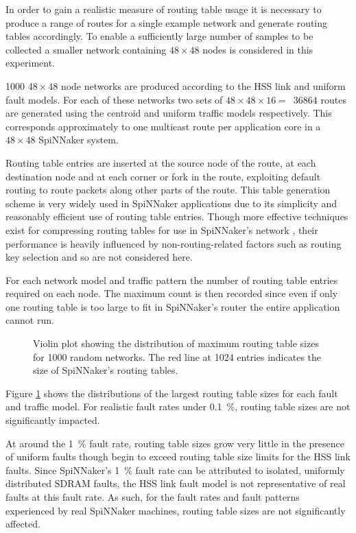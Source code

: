 			In order to gain a realistic measure of routing table usage it is
			necessary to produce a range of routes for a single example network and
			generate routing tables accordingly.  To enable a sufficiently large
			number of samples to be collected a smaller network containing
			$48\times48$ nodes is considered in this experiment.
			
			\num{1000} $48\times48$ node networks are produced according to the HSS
			link and uniform fault models. For each of these networks two sets of
			$48\times48\times16=$~\num{36864} routes are generated using the centroid
			and uniform traffic models respectively. This corresponds approximately
			to one multicast route per application core in a $48\times48$ SpiNNaker
			system.
			
			Routing table entries are inserted at the source node of the route, at
			each destination node and at each corner or fork in the route, exploiting
			default routing to route packets along other parts of the route. This
			table generation scheme is very widely used in SpiNNaker applications due
			to its simplicity and reasonably efficient use of routing table entries.
			Though more effective techniques exist for compressing routing tables for
			use in SpiNNaker's network \cite{mundy16}, their performance is heavily
			influenced by non-routing-related factors such as routing key selection
			and so are not considered here.
			
			For each network model and traffic pattern the number of routing table
			entries required on each node. The maximum count is then recorded since
			even if only one routing table is too large to fit in SpiNNaker's router
			the entire application cannot run.
			
			\begin{figure}
				\center
				
				\caption{Violin plot showing the distribution of maximum routing table
				sizes for \num{1000} random networks. The red line at \num{1024}
				entries indicates the size of SpiNNaker's routing tables.}
				\label{fig:routing-entries}
			\end{figure}
			
			Figure \ref{fig:routing-entries} shows the distributions of the largest
			routing table sizes for each fault and traffic model. For realistic fault
			rates under \SI{0.1}{\percent}, routing table sizes are not significantly
			impacted.
			
			At around the \SI{1}{\percent} fault rate, routing table sizes grow very
			little in the presence of uniform faults though begin to exceed routing
			table size limits for the HSS link faults. Since SpiNNaker's
			\SI{1}{\percent} fault rate can be attributed to isolated, uniformly
			distributed SDRAM faults, the HSS link fault model is not representative
			of real faults at this fault rate. As such, for the fault rates and fault
			patterns experienced by real SpiNNaker machines, routing table sizes are
			not significantly affected.
			
